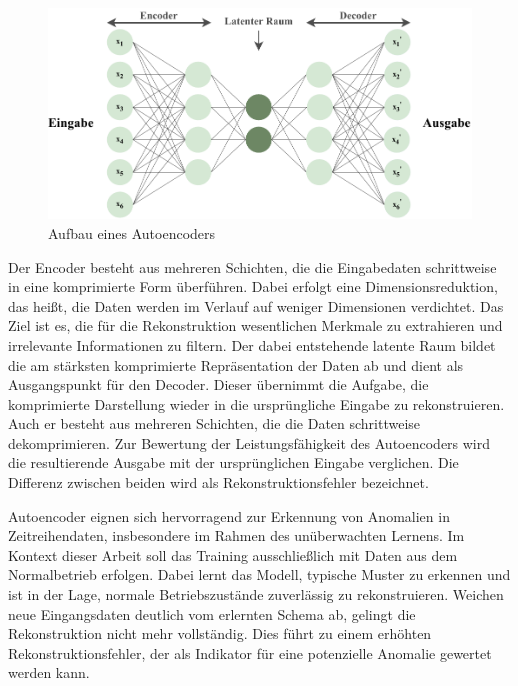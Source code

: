 \begin{figure}[htbp]
    \centering
    \includegraphics[width=1\textwidth]{Bilder/Autoencoder/AutoencoderModell.pdf}
    \caption{Aufbau eines Autoencoders}
    \label{fig:Autoencoder}
\end{figure}

Der Encoder besteht aus mehreren Schichten, die die Eingabedaten schrittweise in eine komprimierte Form überführen. Dabei erfolgt eine Dimensionsreduktion, das heißt, die Daten werden im Verlauf auf weniger Dimensionen verdichtet. 
Das Ziel ist es, die für die Rekonstruktion wesentlichen Merkmale zu extrahieren und irrelevante Informationen zu filtern.
Der dabei entstehende latente Raum bildet die am stärksten komprimierte Repräsentation der Daten ab und dient als Ausgangspunkt für den Decoder.
Dieser übernimmt die Aufgabe, die komprimierte Darstellung wieder in die ursprüngliche Eingabe zu rekonstruieren. 
Auch er besteht aus mehreren Schichten, die die Daten schrittweise dekomprimieren.
Zur Bewertung der Leistungsfähigkeit des Autoencoders wird die resultierende Ausgabe mit der ursprünglichen Eingabe verglichen. 
Die Differenz zwischen beiden wird als Rekonstruktionsfehler bezeichnet. \cite{Autoencoder}

Autoencoder eignen sich hervorragend zur Erkennung von Anomalien in Zeitreihendaten, insbesondere im Rahmen des unüberwachten Lernens.
Im Kontext dieser Arbeit soll das Training ausschließlich mit Daten aus dem Normalbetrieb erfolgen.
Dabei lernt das Modell, typische Muster zu erkennen und ist in der Lage, normale Betriebszustände zuverlässig zu rekonstruieren.
Weichen neue Eingangsdaten deutlich vom erlernten Schema ab, gelingt die Rekonstruktion nicht mehr vollständig.
Dies führt zu einem erhöhten Rekonstruktionsfehler, der als Indikator für eine potenzielle Anomalie gewertet werden kann.

